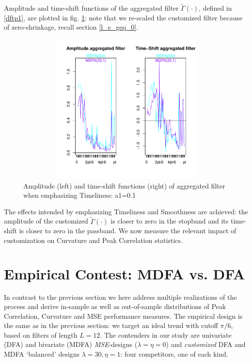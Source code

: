 \documentclass[a4paper]{book}
\begin{document}
Amplitude and time-shift functions of the aggregated filter $\tilde{\Gamma}(\cdot)$, defined in \ref{dftp1}, are plotted in fig. \ref{z_amp_shift_mdfacust_leadind_agg_ST}: note that we re-scaled the customized filter because of zero-shrinkage, recall section \ref{l_e_geq_0}.
\begin{figure}[H]\begin{center}\includegraphics[height=3in, width=6in]{z_amp_shift_mdfacust_leadind_agg_ST}\caption{Amplitude (left) and time-shift functions (right) of aggregated filter when emphasizing Timeliness: a1=0.1\label{z_amp_shift_mdfacust_leadind_agg_ST}}\end{center}\end{figure}The effects intended by emphasizing Timeliness and Smoothness are achieved: the amplitude of the customized $\tilde{\Gamma}(\cdot)$ is closer to zero in the stopband and its time-shift is closer to zero in the passband. We now measure the relevant impact of customization on Curvature and Peak Correlation statistics.






\section{Empirical Contest: MDFA vs. DFA}\label{emp_con_m_d}

In contrast to the previous section we here address multiple realizations of the process and derive in-sample as well as out-of-sample distributions of Peak Correlation, Curvature and MSE performance measures. The empirical design is the same as in the previous section: we target an ideal trend with cutoff $\pi/6$, based on filters of length $L=12$. The contenders in our study are univariate (DFA) and bivariate (MDFA) \emph{MSE}-designs ($\lambda=\eta=0$) and  \emph{customized} DFA and MDFA `balanced' designs  $\lambda=30,\eta=1$: four competitors, one of each kind. 
\end{document}
